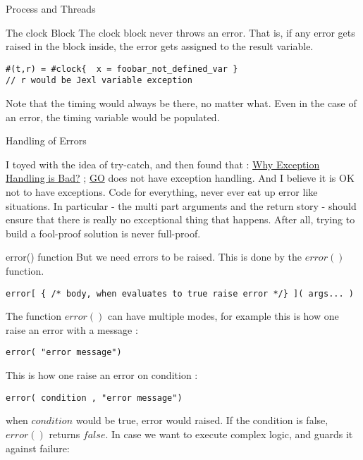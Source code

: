 \begin{section}{Process and Threads}
\begin{subsection}{The clock Block}
The clock block never throws an error.
That is, if any error gets raised in the block inside,
the error gets assigned to the result variable.
\begin{lstlisting}[style=JexlStyle]
#(t,r) = #clock{  x = foobar_not_defined_var }
// r would be Jexl variable exception
\end{lstlisting}

Note that the timing would always be there, 
no matter what. Even in the case of an error, 
the timing variable would be populated.

\end{subsection}

\end{section}

\begin{section}{Handling of Errors}

I toyed with the idea of try-catch, and then found that : 
\href{http://stackoverflow.com/questions/1736146/why-is-exception-handling-bad}{Why Exception Handling is Bad?} ; 
\href{https://gobyexample.com/errors}{GO} does not have exception handling. 
And I believe it is OK not to have exceptions.
Code for everything, never ever eat up error like situations. 
In particular - the multi part arguments and the return story - should ensure that there is really no exceptional thing that happens. 
After all, trying to build a fool-proof solution is never full-proof.

\begin{subsection}{error() function}
But we need errors to be raised. This is done by the $error()$ function.

\begin{lstlisting}[style=JexlStyle]
error[ { /* body, when evaluates to true raise error */} ]( args... )   
\end{lstlisting}
The function $error()$ can have multiple modes, 
for example this is how one raise an error with a message :
\begin{lstlisting}[style=JexlStyle]
error( "error message")   
\end{lstlisting}
This is how one raise an error on condition :
\begin{lstlisting}[style=JexlStyle]
error( condition , "error message")   
\end{lstlisting}
when $condition$ would be true, error would raised.
If the condition is false, $error()$ returns $false$.
In case we want to execute complex logic, and guards it against failure:


\end{subsection}
\end{section}
